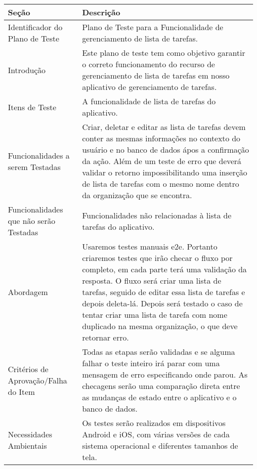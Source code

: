         \begin{tabularx}{\textwidth}{|X|X|}
                \hline
                Seção & Descrição \\
                \hline
                Identificador do Plano de Teste & Plano de Teste para a Funcionalidade de gerenciamento de lista de tarefas. \\
                \hline
                Introdução & Este plano de teste tem como objetivo garantir o correto funcionamento do recurso de gerenciamento de lista de tarefas em nosso aplicativo de gerenciamento de tarefas. \\
                \hline
                Itens de Teste & A funcionalidade de lista de tarefas do aplicativo. \\
                \hline
                Funcionalidades a serem Testadas & Criar, deletar e editar as lista de tarefas devem conter as mesmas informações no contexto do usuário e no banco de dados ápos a confirmação da ação. Além de um teste de erro que deverá validar o retorno impossibilitando uma inserção de lista de tarefas com o mesmo nome dentro da organização que se encontra.\\
                \hline
                Funcionalidades que não serão Testadas & Funcionalidades não relacionadas à lista de tarefas do aplicativo. \\
                \hline
                Abordagem & Usaremos testes manuais \acrshort{e2e}. Portanto criaremos testes que irão checar o fluxo por completo, em cada parte terá uma validação da resposta. O fluxo será criar uma lista de tarefas, seguido de editar essa lista de tarefas e depois deleta-lá. Depois será testado o caso de tentar criar uma lista de tarefa com nome duplicado na mesma organização, o que deve retornar erro.\\
                \hline
                Critérios de Aprovação/Falha do Item & Todas as etapas serão validadas e se alguma falhar o teste inteiro irá parar com uma mensagem de erro especificando onde parou. As checagens serão uma comparação direta entre as mudanças de estado entre o aplicativo e o banco de dados.\\
                \hline
                Necessidades Ambientais & Os testes serão realizados em dispositivos Android e iOS, com várias versões de cada sistema operacional e diferentes tamanhos de tela. \\
                \hline
            \end{tabularx}